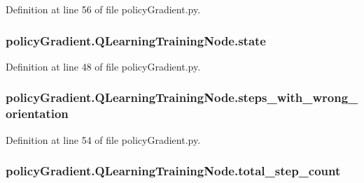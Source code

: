 Definition at line 56 of file policy\+Gradient.\+py.

\subsubsection[{\texorpdfstring{state}{state}}]{\setlength{\rightskip}{0pt plus 5cm}policy\+Gradient.\+Q\+Learning\+Training\+Node.\+state}\hypertarget{classpolicy_gradient_1_1_q_learning_training_node_ade80819acefe831706a4f02c100d672e}{}\label{classpolicy_gradient_1_1_q_learning_training_node_ade80819acefe831706a4f02c100d672e}


Definition at line 48 of file policy\+Gradient.\+py.

\subsubsection[{\texorpdfstring{steps\+\_\+with\+\_\+wrong\+\_\+orientation}{steps_with_wrong_orientation}}]{\setlength{\rightskip}{0pt plus 5cm}policy\+Gradient.\+Q\+Learning\+Training\+Node.\+steps\+\_\+with\+\_\+wrong\+\_\+orientation}\hypertarget{classpolicy_gradient_1_1_q_learning_training_node_a6cb5dc15ea6127cba744ff99e92748e1}{}\label{classpolicy_gradient_1_1_q_learning_training_node_a6cb5dc15ea6127cba744ff99e92748e1}


Definition at line 54 of file policy\+Gradient.\+py.

\subsubsection[{\texorpdfstring{total\+\_\+step\+\_\+count}{total_step_count}}]{\setlength{\rightskip}{0pt plus 5cm}policy\+Gradient.\+Q\+Learning\+Training\+Node.\+total\+\_\+step\+\_\+count}\hypertarget{classpolicy_gradient_1_1_q_learning_training_node_a51b494957db227f163dab00919accd14}{}\label{classpolicy_gradient_1_1_q_learning_training_node_a51b494957db227f163dab00919accd14}


